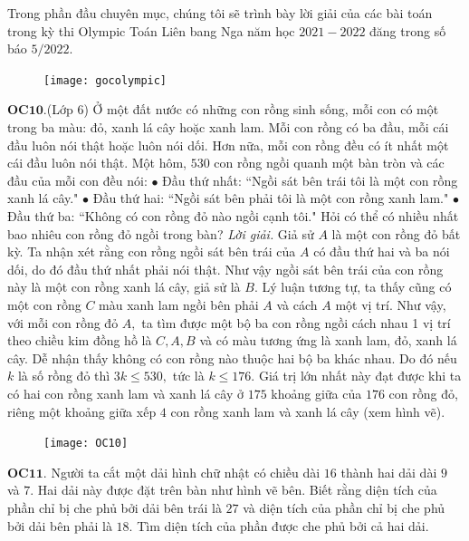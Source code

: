 \begin{multicols}{2}
	Trong phần đầu chuyên mục, chúng tôi sẽ trình bày lời giải của các bài toán trong kỳ thi Olympic Toán Liên bang Nga năm học $2021-2022$ đăng trong số báo $5/2022$. 
	\begin{figure}[H]
		\vspace*{-5pt}
		\centering
		\captionsetup{labelformat= empty, justification=centering}
		\texttt{[image: gocolympic]}
		\vspace*{-15pt}
	\end{figure}
	{\bf\color{cackithi} OC$\pmb{10.}$}(Lớp $6$) Ở một đất nước có những con rồng sinh sống, mỗi con có một trong ba màu: đỏ, xanh lá cây hoặc xanh lam. Mỗi con rồng có ba đầu, mỗi cái đầu luôn nói thật hoặc luôn nói dối. Hơn nữa, mỗi con rồng đều có ít nhất một cái đầu luôn nói thật. 
	Một hôm, $530$ con rồng ngồi quanh một bàn tròn và các đầu của mỗi con đều nói:
	\vskip 0.1cm
	$\bullet$ Đầu thứ nhất: ``Ngồi sát bên trái tôi là một con rồng xanh lá cây."
	\vskip 0.1cm
	$\bullet$ Đầu thứ hai: ``Ngồi sát bên phải tôi là một con rồng xanh lam."
	\vskip 0.1cm
	$\bullet$ Đầu thứ ba: ``Không có con rồng đỏ nào ngồi cạnh tôi."
	\vskip 0.1cm
	Hỏi có thể có nhiều nhất bao nhiêu con rồng đỏ ngồi trong bàn?
	\vskip 0.1cm
	\textit{Lời giải.} Giả sử $A$ là một con rồng đỏ bất kỳ. Ta nhận xét rằng con rồng ngồi sát bên trái của $A$ có đầu thứ hai và ba nói dối, do đó đầu thứ nhất phải nói thật. Như vậy ngồi sát bên trái của con rồng này là một con rồng xanh lá cây, giả sử là $B.$ Lý luận tương tự, ta thấy cũng có một con rồng $C$ màu xanh lam ngồi bên phải $A$ và cách $A$ một vị trí.
	\vskip 0.1cm
	Như vậy, với mỗi con rồng đỏ $A,$ ta tìm được một bộ ba con rồng ngồi cách nhau 1 vị trí theo chiều kim đồng hồ là $C, A, B$ và có màu tương ứng là xanh lam, đỏ, xanh lá cây. Dễ nhận thấy không có con rồng nào thuộc hai bộ ba khác nhau. Do đó nếu $k$ là số rồng đỏ thì $3k\le 530,$ tức là $k\le 176.$
	\vskip 0.1cm
	Giá trị lớn nhất này đạt được khi ta có hai con rồng xanh lam và xanh lá cây ở $175$ khoảng giữa của $176$ con rồng đỏ, riêng một khoảng giữa xếp $4$ con rồng xanh lam và xanh lá cây (xem hình vẽ).
	\begin{figure}[H]
		\vspace*{-5pt}
		\centering
		\captionsetup{labelformat= empty, justification=centering}
		\texttt{[image: OC10]}
		\vspace*{-15pt}
	\end{figure}
	{\bf\color{cackithi} OC$\pmb{11.}$} Người ta cắt một dải hình chữ nhật có chiều dài $16$ thành hai dải dài $9$ và $7$. Hai dải này được đặt trên bàn như hình vẽ bên. Biết rằng diện tích của phần chỉ bị che phủ bởi dải bên trái là $27$ và diện tích của phần chỉ bị che phủ bởi dải bên phải là $18$. Tìm diện tích của phần được che phủ bởi cả hai dải.

\end{multicols}
